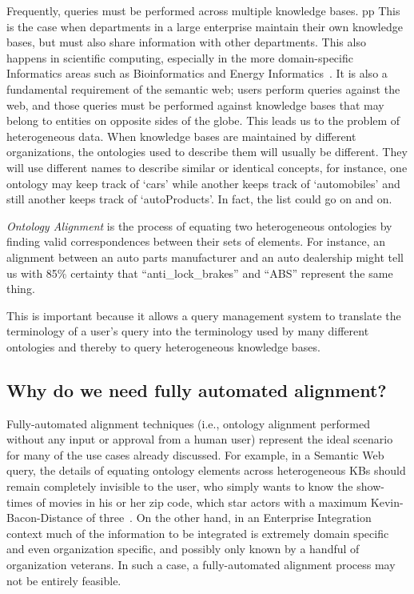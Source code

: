 \documentclass[letterpaper,twocolumn,12pt]{article}
\begin{document}
Frequently, queries must be performed across multiple knowledge bases. pp
This is the case when departments in a large enterprise maintain their own knowledge bases, but must also share information with other departments. 
This also happens in scientific computing, especially in the more domain-specific Informatics areas such as Bioinformatics and Energy Informatics~\cite{cotterell:2012:oei}.
It is also a fundamental requirement of the semantic web; users perform queries against the web, and those queries must be performed against knowledge bases that may belong to entities on opposite sides of the globe. 
This leads us to the problem of heterogeneous data. 
When knowledge bases are maintained by different organizations, the ontologies used to describe them will usually be different. 
They will use different names to describe similar or identical concepts, for instance, one ontology may keep track of `cars' while another keeps track of `automobiles' and still another keeps track of `autoProducts'. 
In fact, the list could go on and on.

\textit{Ontology Alignment} is the process of equating two heterogeneous ontologies by finding valid correspondences between their sets of elements. 
%
For instance, an alignment between an auto parts manufacturer and an auto dealership might tell us with 85\% certainty that ``anti\_lock\_brakes'' and ``ABS'' represent the same thing.

This is important because it allows a query management system to translate the terminology of a user's query into the terminology used by many different ontologies and thereby to query heterogeneous knowledge bases.

\subsection{Why do we need fully automated alignment?}
\label{subsec:automated}
Fully-automated alignment techniques (i.e., ontology alignment performed without any input or approval from a human user) represent the ideal scenario for many of the use cases already discussed. 
For example, in a Semantic Web query, the details of equating ontology elements across heterogeneous KBs should remain completely invisible to the user, who simply wants to know the show-times of movies in his or her zip code, which star actors with a maximum Kevin-Bacon-Distance of three~\cite{hayes:2000:graph}.
On the other hand, in an Enterprise Integration context much of the information to be integrated is extremely domain specific and even organization specific, and possibly only known by a handful of organization veterans. 
In such a case, a fully-automated alignment process may not be entirely feasible.
\end{document}
